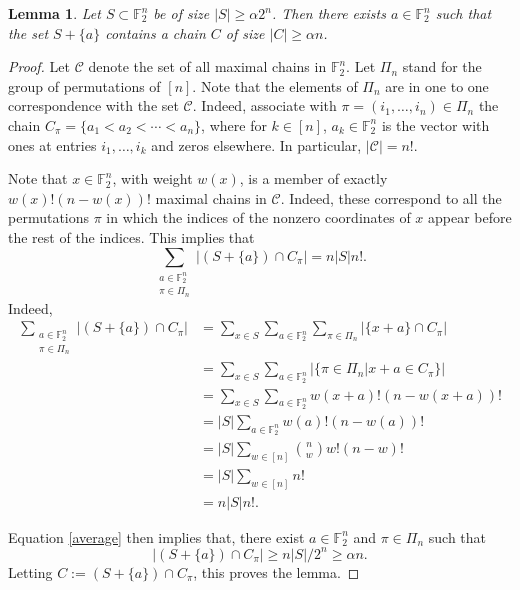 \documentclass{article}
\newtheorem{lem}[thm]{Lemma}
\theoremstyle{definition}
\begin{document}
\begin{lem}\label{lem:pigeonhole}
Let $S\subset \mathbb{F}_2^n$ be of size $|S|\ge \alpha 2^n$.
Then there exists $a\in \mathbb{F}_2^n$ such that the set $S+\{a\}$  contains a chain  $C$ of size $|C|\ge \alpha n$.
\end{lem}
\begin{proof}
Let $\mathcal{C}$ denote the set of all maximal chains in $\mathbb{F}_2^n$. Let $\Pi_n$ stand for the group of permutations of $[n]$. 
Note that the elements of $\Pi_n$ are in one to one correspondence with the set $\mathcal{C}$. Indeed, associate with $\pi=(i_1,\ldots,i_n)\in \Pi_n$ the chain $C_\pi=\{a_1<a_2<\cdots<a_n\}$, where for $k\in [n]$, $a_k\in\mathbb{F}_2^n$ is the vector with ones at entries $i_1,\ldots,i_k$ and zeros elsewhere. In particular, $|\mathcal{C}|=n!$.

Note that $x\in \mathbb{F}_2^n$, with weight $w(x)$, is a member of exactly $w(x)!(n-w(x))!$ maximal chains in $\mathcal{C}$. Indeed, these correspond to all the permutations $\pi$  in which the indices of the nonzero coordinates of $x$ appear before the rest of the indices. 
This implies that 
\begin{equation}\label{average}
    \sum_{\substack{a\in \mathbb{F}_2^n\\\pi\in \Pi_n}}
\left | (S+\{a\}) \cap C_\pi\right | =n|S|n!.
\end{equation}
Indeed,
\begin{align*}
\sum_{\substack{a\in \mathbb{F}_2^n\\\pi\in \Pi_n}}
\left | (S+\{a\}) \cap C_\pi\right | &=
\sum_{x\in S}
\sum_{ a\in \mathbb{F}_2^n}
\sum_{\pi\in\Pi_n}
\left | \{x+a\} \cap C_\pi\right | \\
&= 
\sum_{x\in S}\sum_{ a\in \mathbb{F}_2^n}
\left | \{\pi\in\Pi_n |x+a\in C_\pi\}\right |\\
&=
\sum_{x\in S}\sum_{ a\in \mathbb{F}_2^n}
w(x+a)!(n-w(x+a))! \\
&=
|S|\sum_{ a\in \mathbb{F}_2^n}
w(a)!(n-w(a))! \\
&= 
|S|
\sum_{ w\in[n]}
\binom{n}{w}w!(n-w)!\\
&= 
|S|
\sum_{ w\in[n]}n!\\
&=n|S|n!.
\end{align*}

Equation \eqref{average} then implies that, there exist $a\in \mathbb{F}_2^n$ and $\pi\in\Pi_n$ such that 
$$
|(S+\{a\})\cap C_\pi|
\ge
n|S|/2^n\ge \alpha n.
$$
Letting $C:=(S+\{a\})\cap C_\pi$, this proves the lemma. 
\end{proof}
\end{document}
